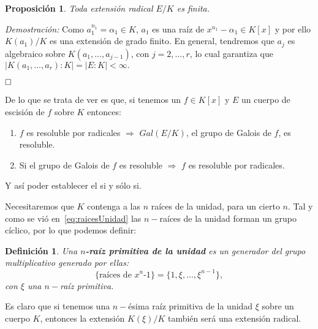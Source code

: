 \documentclass[12pt]{article}
\newtheorem{proposition}[theorem]{Proposición}
\newtheorem{definition}[theorem]{Definición}
\begin{document}
\begin{proposition}Toda extensión radical $E/K$ es finita.
\end{proposition}
\emph{Demostración: }Como $a_{1}^{n_{1}} = \alpha_{1} \in K$, $a_{1}$ es una raíz de $x^{n_{1}}-\alpha_{1} \in K[x]$ y por ello $K(a_{1})/K$ es una extensión de grado finito. En general, tendremos que $a_{j}$ es algebraico sobre $K(a_{1}, \ldots, a_{j-1})$, con $j=2, \ldots, r$, lo cual garantiza que $|K(a_{1}, \ldots,a_{r}) :K| = |E:K| < \infty.$

$\hfill \square$


De lo que se trata de ver es que, si tenemos un $f \in K[x]$ y $E$ un cuerpo de escisión de $f$ sobre $K$ entonces:

\begin{enumerate}
\item $f$ es resoluble por radicales $\Rightarrow$ $Gal(E/K)$, el grupo de Galois de $f$, es resoluble.
\item Si el grupo de Galois de $f$ es resoluble $\Rightarrow$ $f$ es resoluble por radicales.
\end{enumerate}

Y así poder establecer el si y sólo si.

Necesitaremos que $K$ contenga a las $n$ raíces de la unidad, para un cierto $n$. Tal y como se vió en~\ref{eq:raicesUnidad} las $n-$raíces de la unidad forman un grupo cíclico, por lo que podemos definir:

\begin{definition} Una \textbf{$n$-raíz primitiva de la unidad} es un generador del grupo multiplicativo generado por ellas: $$ \lbrace \text{raíces de $x^{n}$-1}\rbrace =\lbrace 1, \xi, \ldots, \xi^{n-1} \rbrace,$$ con $\xi$ una $n-$raíz primitiva.
\end{definition}

Es claro que si tenemos una $n-$ésima raíz primitiva de la unidad $\xi$ sobre un cuerpo $K$, entonces la extensión $K(\xi)/K$ también será una extensión radical.
\end{document}
